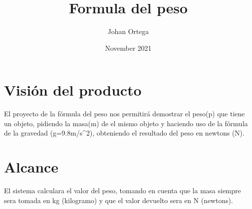 \documentclass{article}
\title{Formula del peso}
\author{Johan Ortega }
\date{November 2021}
\begin{document}
\maketitle

\section{Visión del producto}

El proyecto de la fórmula del peso nos permitirá demostrar el peso(p) que tiene un objeto, pidiendo la masa(m) de el mismo objeto y haciendo uso de la fórmula de la gravedad (g=9.8m/s^2), obteniendo el resultado del peso en newtons (N).


\section{Alcance}

El sistema calculara el valor del peso, tomando en cuenta que la masa siempre sera tomada en kg (kilogramo) y que el valor devuelto sera en N (newtons).
\end{document}
